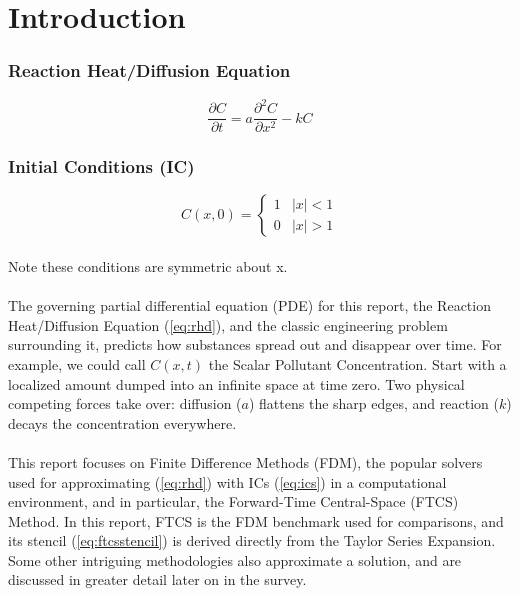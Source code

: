 \section*{Introduction} 

\subsubsection*{Reaction Heat/Diffusion Equation}
\begin{equation}
\label{eq:rhd}
\frac{\partial C}{\partial t} = a \frac{\partial^2 C}{\partial x^2} - kC
\end{equation}

\subsubsection*{Initial Conditions (IC)}
\begin{equation}
\label{eq:ics}
C(x,0) = \begin{cases} 1 & |x| < 1 \\ 0 & |x| > 1 \end{cases}
\end{equation}

\paragraph{}
Note these conditions are symmetric about x.
\paragraph{}
The governing partial differential equation (PDE) for this report, the Reaction Heat/Diffusion Equation (\ref{eq:rhd}), and the classic engineering problem surrounding it, predicts how substances spread out and disappear over time. For example, we could call $C(x,t)$ the Scalar Pollutant Concentration. Start with a localized amount dumped into an infinite space at time zero. Two physical competing forces take over: diffusion ($a$) flattens the sharp edges, and reaction ($k$) decays the concentration everywhere. 
\paragraph{}
This report focuses on Finite Difference Methods (FDM), the popular solvers used for approximating (\ref{eq:rhd}) with ICs (\ref{eq:ics}) in a computational environment, and in particular, the Forward-Time Central-Space (FTCS) Method. In this report, FTCS is the FDM benchmark used for comparisons, and its stencil (\ref{eq:ftcsstencil}) is derived directly from the Taylor Series Expansion. Some other intriguing methodologies also approximate a solution, and are discussed in greater detail later on in the survey. 


